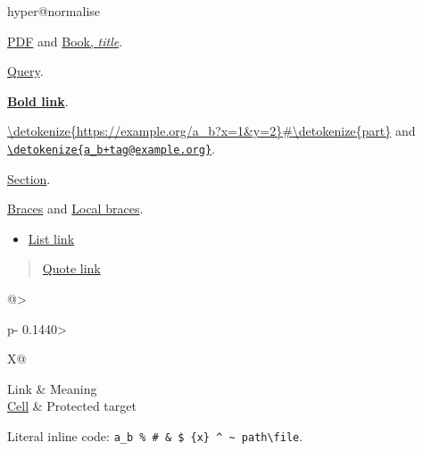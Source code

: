 \ifcsname hyper@normalise\endcsname\else\PackageError{mark2tex}{Markdown links require hyperref}{Load \string\usepackage{hyperref} in the document preamble.}\fi
\begin{frame}[t]

\href{\detokenize{unterlagen/Auswahl der Inhalte.pdf}}{PDF} and \href{\detokenize{books/Book_name.pdf}}{Book, \emph{title}}.

\href{\detokenize{https://example.org/a}\%\detokenize{20b}\%\detokenize{20c?x=1&y=$@_}\#\detokenize{frag}}{Query}.

\textbf{\href{\detokenize{https://example.org/bold}\%\detokenize{20text?a=1&b=2}\#\detokenize{part}}{Bold link}}.

\url{\detokenize{https://example.org/a_b?x=1&y=2}\#\detokenize{part}} and \href{\detokenize{mailto:a_b+tag@example.org}}{\nolinkurl{\detokenize{a_b+tag@example.org}}}.

\hyperref[\detokenize{grundlagen}]{Section}.

\href{\detokenize{https://example.org/a}\Uchar123 \detokenize{b}\Uchar125 \Uchar94 \Uchar94 \detokenize{c}\Uchar92 \detokenize{d}}{Braces} and \href{\detokenize{unterlagen/a}\Uchar123 \detokenize{b}\Uchar125 \detokenize{.pdf}}{Local braces}.

\begin{itemize}
\item \href{\detokenize{https://example.org/list}}{List link}
\end{itemize}

\begin{quote}
\href{\detokenize{https://example.org/quote}}{Quote link}
\end{quote}

\par\addvspace{\medskipamount}
\noindent\begin{tabularx}{\linewidth}{@{}>{\raggedright\arraybackslash}p{}>{\raggedright\arraybackslash}X@{}}
\toprule
Link & Meaning \\
\midrule
\href{\detokenize{https://example.org/$@_}}{Cell} & Protected target \\
\bottomrule
\end{tabularx}
\par\addvspace{\medskipamount}

Literal inline code: \texttt{a\_b \% \# \& \$ \{x\} \textasciicircum{} \textasciitilde{} path\textbackslash{}file}.

\end{frame}

